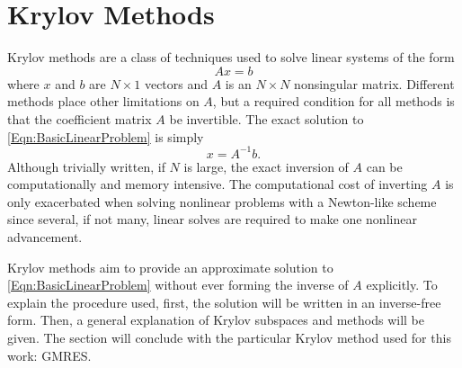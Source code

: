 \documentclass[Prelim,12pt]{WisconsinThesis}
\newcommand{\by}    {\!\times\!}
\begin{document}
\section{Krylov Methods}
Krylov methods are a class of techniques used to solve linear systems of the form
\begin{equation}
    A x = b
    \label{Eqn:BasicLinearProblem}
\end{equation}
where $x$ and $b$ are $N \by 1$ vectors and $A$ is an $N \by N$ nonsingular matrix.
Different methods place other limitations on $A$, but a required condition for all methods is that the coefficient matrix $A$ be invertible.
The exact solution to \cref{Eqn:BasicLinearProblem} is simply
\begin{equation}
    x = A^{-1} b.
    \label{Eqn:BasicLinearSolution}
\end{equation}
Although trivially written, if $N$ is large, the exact inversion of $A$ can be computationally and memory intensive.
The computational cost of inverting $A$ is only exacerbated when solving nonlinear problems with a Newton-like scheme since several, if not many, linear solves are required to make one nonlinear advancement.

Krylov methods aim to provide an approximate solution to \cref{Eqn:BasicLinearProblem} without ever forming the inverse of $A$ explicitly.
To explain the procedure used, first, the solution will be written in an inverse-free form.
Then, a general explanation of Krylov subspaces and methods will be given.
The section will conclude with the particular Krylov method used for this work: GMRES.
\end{document}
